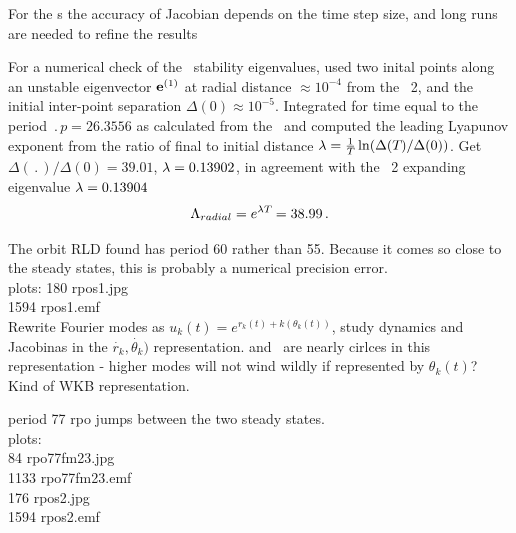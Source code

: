 For the \rpo s the accuracy of Jacobian depends
on the time step size, and long runs are needed to refine the results

For a numerical check of the \rpo\ stability eigenvalues,
used two inital
points along an unstable eigenvector ${\mathbf e}^{(1)}$
at radial distance  $\approx 10^{-4}$ from the \eqv\ {\nameit}2,
and the initial inter-point separation $\Delta(0) \approx 10^{-5}$.
Integrated for time equal to the period $\period{p}=26.3556$ as calculated from
the \jacobianM\ and computed the leading Lyapunov exponent from the ratio of
final to initial distance
$\lambda= \frac{1 }{ {T_{}}}\ln( \Delta({T_{}})/\Delta(0))$.
Get
$\Delta(\period{})/\Delta(0) =39.01$,
$\lambda=0.13902$, in agreement with the \eqv\ {\nameit}2
expanding eigenvalue $\lambda=0.13904$
\[
\Lambda_{radial} =  e^{\lambda {T_{}}} =38.99
\,.
\]

The orbit RLD found has period 60
rather than 55.  Because it comes so close to the steady states,
this is probably a numerical precision error.
\\
plots:
 180 rpos1.jpg  \\
1594 rpos1.emf  \\


Rewrite Fourier modes as $u_k(t) = e^{r_k(t) + k(\theta_k(t))}$, study
dynamics and Jacobinas in the $\dot{r_k},\dot{\theta_k})$ representation.
 and  \eqva\ are nearly cirlces in this representation - higher
modes will not wind wildly if represented by $\theta_k(t)$? Kind of WKB
representation.

period 77 rpo jumps between the two steady states.
\\
plots:  \\
  84 rpo77fm23.jpg  \\
1133 rpo77fm23.emf  \\
 176 rpos2.jpg  \\
1594 rpos2.emf  \\


\bigskip

